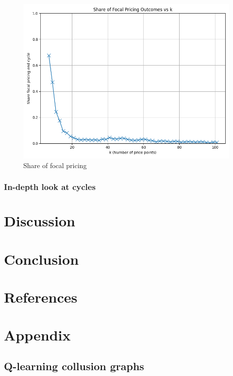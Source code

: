 \documentclass{article}
\begin{document}
\begin{figure}[H]
    \centering
    \includegraphics[scale = 0.5]{ShareFocal1000NumRuns.png}
    \caption{Share of focal pricing}
    \label{fig:ShareFocalPricing}
\end{figure}


\subsubsection{In-depth look at cycles}
\label{In-depth look at cycles}


\section{Discussion}


\section{Conclusion}

\newpage 


\section{References}





\section{Appendix}
\subsection{Q-learning collusion graphs}
\end{document}
